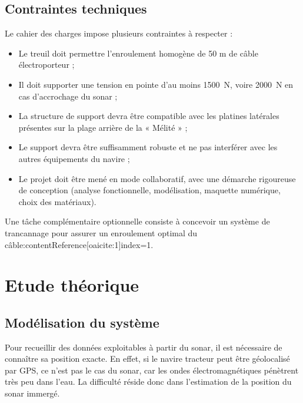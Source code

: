\documentclass[12pt,a4paper]{report}
\begin{document}
\section{Contraintes techniques}


Le cahier des charges impose plusieurs contraintes à respecter :

\begin{itemize}
  \item Le treuil doit permettre l’enroulement homogène de 50 m de câble électroporteur ;
  \item Il doit supporter une tension en pointe d’au moins 1500~N, voire 2000~N en cas d’accrochage du sonar ;
  \item La structure de support devra être compatible avec les platines latérales présentes sur la plage arrière de la
  « Mélité » ;
  \item Le support devra être suffisamment robuste et ne pas interférer avec les autres équipements du navire ;
  \item Le projet doit être mené en mode collaboratif, avec une démarche rigoureuse de conception
  (analyse fonctionnelle, modélisation, maquette numérique, choix des matériaux).

\end{itemize}


Une tâche complémentaire optionnelle consiste à concevoir un système de trancannage pour assurer un enroulement
optimal du câble:contentReference[oaicite:1]{index=1}.




\chapter{Etude théorique}

\section{Modélisation du système}


Pour recueillir des données exploitables à partir du sonar, il est nécessaire de connaître sa position exacte.
En effet, si le navire tracteur peut être géolocalisé par GPS, ce n’est pas le cas du sonar, car les ondes électromagnétiques pénètrent très peu dans l’eau.
La difficulté réside donc dans l’estimation de la position du sonar immergé.
\end{document}
